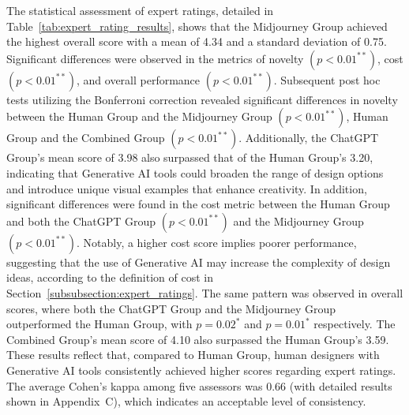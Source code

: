 \documentclass{dsj}
\begin{document}
The statistical assessment of expert ratings, detailed in Table~\ref{tab:expert_rating_results}, shows that the Midjourney Group achieved the highest overall score with a mean of 4.34 and a standard deviation of 0.75. Significant differences were observed in the metrics of novelty $(p<0.01^{**})$, cost $(p<0.01^{**})$, and overall performance $(p<0.01^{**})$. Subsequent post hoc tests utilizing the Bonferroni correction revealed significant differences in novelty between the Human Group and the Midjourney Group $(p<0.01^{**})$, Human Group and the Combined Group $(p<0.01^{**})$. Additionally, the ChatGPT Group's mean score of 3.98 also surpassed that of the Human Group's 3.20, indicating that Generative AI tools could broaden the range of design options and introduce unique visual examples that enhance creativity. In addition, significant differences were found in the cost metric between the Human Group and both the ChatGPT Group $(p<0.01^{**})$ and the Midjourney Group $(p<0.01^{**})$. Notably, a higher cost score implies poorer performance, suggesting that the use of Generative AI may increase the complexity of design ideas, according to the definition of cost in Section~\ref{subsubsection:expert_ratings}. The same pattern was observed in overall scores, where both the ChatGPT Group and the Midjourney Group outperformed the Human Group, with $p=0.02^{*}$ and $p=0.01^{*}$ respectively. The Combined Group's mean score of 4.10 also surpassed the Human Group's 3.59. These results reflect that, compared to Human Group, human designers with Generative AI tools consistently achieved higher scores regarding expert ratings. The average Cohen’s kappa among five assessors was 0.66 (with detailed results shown in Appendix~C), which indicates an acceptable level of consistency. 
\end{document}
